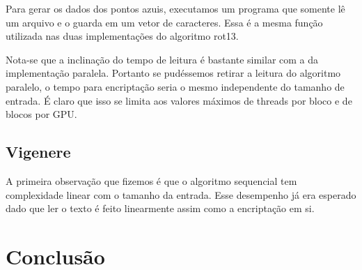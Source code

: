 \documentclass[12pt]{article}
\begin{document}
Para gerar os dados dos pontos azuis, executamos um programa que somente
lê um arquivo e o guarda em um vetor de caracteres. Essa é a mesma
função utilizada nas duas implementações do algoritmo rot13. 

Nota-se que a inclinação do tempo de leitura é bastante similar com a da
implementação paralela. Portanto se pudéssemos retirar a leitura do 
algoritmo paralelo, o tempo para encriptação seria o mesmo independente
do tamanho de entrada. É claro que isso se limita aos valores máximos
de threads por bloco e de blocos por GPU. 

\subsection{Vigenere}
A primeira observação que fizemos é que o algoritmo sequencial tem 
complexidade linear com o tamanho da entrada. Esse desempenho já era 
esperado dado que ler o texto é feito linearmente assim como a 
encriptação em si.

\begin{center}
\begin{figure}[H]
\end{figure}
\end{center}



\newpage
\section{Conclusão}
\end{document}
